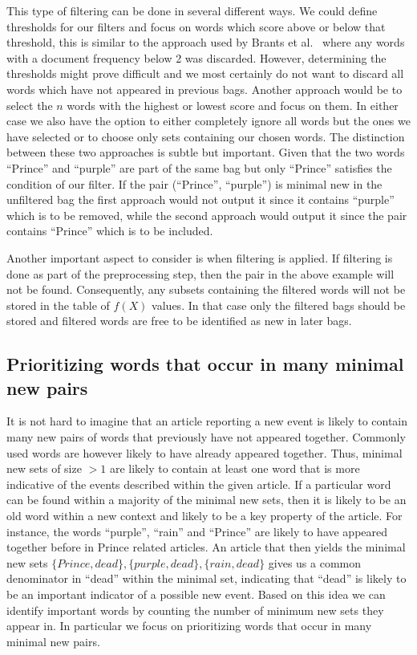 This type of filtering can be done in several different ways. We could define thresholds for our filters and focus on words which score above or below that threshold, this is similar to the approach used by Brants et al.~\cite{brants2003system} where any words with a document frequency below 2 was discarded. However, determining the thresholds might prove difficult and we most certainly do not want to discard all words which have not appeared in previous bags. Another approach would be to select the $n$ words with the highest or lowest score and focus on them. In either case we also have the option to either completely ignore all words but the ones we have selected or to choose only sets containing our chosen words. The distinction between these two approaches is subtle but important. Given that the two words ``Prince'' and ``purple'' are part of the same bag but only ``Prince'' satisfies the condition of our filter. If the pair (``Prince'', ``purple'') is minimal new in the unfiltered bag the first approach would not output it since it contains ``purple'' which is to be removed, while the second approach would output it since the pair contains ``Prince'' which is to be included. 

Another important aspect to consider is when filtering is applied. If filtering is done as part of the preprocessing step, then the pair in the above example will not be found. Consequently, any subsets containing the filtered words will not be stored in the table of $f(X)$ values. In that case only the filtered bags should be stored and filtered words are free to be identified as new in later bags. 

\subsection{Prioritizing words that occur in many minimal new pairs}
It is not hard to imagine that an article reporting a new event is likely to contain many new pairs of words that previously have not appeared together. Commonly used words are however likely to have already appeared together. Thus, minimal new sets of size $>1$ are likely to contain at least one word that is more indicative of the events described within the given article. If a particular word can be found within a majority of the minimal new sets, then it is likely to be an old word within a new context and likely to be a key property of the article. For instance, the words ``purple'', ``rain'' and ``Prince'' are likely to have appeared together before in Prince related articles. An article that then yields the minimal new sets $\{Prince, dead\}, \{purple, dead\}, \{rain, dead\}$ gives us a  common denominator in ``dead'' within the minimal set, indicating that ``dead'' is likely to be an important indicator of a possible new event. Based on this idea we can identify important words by counting the number of minimum new sets they appear in. In particular we focus on prioritizing words that occur in many minimal new pairs.

